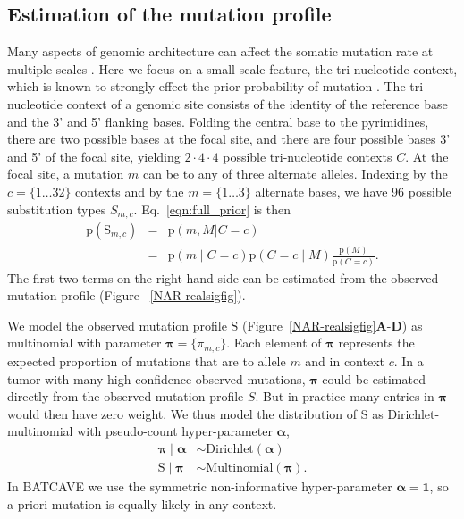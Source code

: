 \documentclass[a4,center,fleqn]{NAR}
\newcommand{\batcave}{BATCAVE }
\begin{document}
\subsection{Estimation of the mutation profile}
Many aspects of genomic architecture can affect the somatic mutation rate at multiple scales \cite{Buisson2019}.
Here we focus on a small-scale feature, the tri-nucleotide context, which is known to strongly effect the prior probability of mutation \citep{Nik-Zainal2012a,Alexandrov2015,Lee-Six2018}.
The tri-nucleotide context of a genomic site consists of the identity of the reference base and the 3' and 5' flanking bases.
Folding the central base to the pyrimidines, there are two possible bases at the focal site, and there are four possible bases 3' and 5' of the focal site, yielding $2 \cdot 4 \cdot 4$ possible tri-nucleotide contexts $C$.
At the focal site, a mutation $m$ can be to any of three alternate alleles.
Indexing by the $c=\{1 \dots 32\}$ contexts and by the $m = \{1 \dots 3\}$ alternate bases, we have 96 possible substitution types $S_{m,c}$.
Eq.~\ref{eqn:full_prior} is then
\begin{equation}
  \label{eqn:detailed_prior}
  \begin{array}{rcl}
  \mathrm{p}(\mathrm{S}_{m,c}) &=&  \mathrm{p}(m, M | C = c) \\
                            &=& \mathrm{p}(m \mid C = c) \mathrm{p}(C = c \mid M)\frac{\mathrm{p}(M)}{\mathrm{p}(C = c)}.
  \end{array}
\end{equation}
The first two terms on the right-hand side can be estimated from the observed mutation profile (Figure ~\ref{NAR-realsigfig}).

We model the observed mutation profile $\mathrm{S}$ (Figure~\ref{NAR-realsigfig}\textbf{A}-\textbf{D}) as multinomial with parameter $\boldsymbol{\pi} = \{\pi_{m,c}\}$.
Each element of $\boldsymbol{\pi}$ represents the expected proportion of mutations that are to allele $m$ and in context $c$.
In a tumor with many high-confidence observed mutations, $\boldsymbol{\pi}$ could be estimated directly from the observed mutation profile $S$.
But in practice many entries in $\boldsymbol{\pi}$ would then have zero weight.
We thus model the distribution of $\mathrm{S}$ as Dirichlet-multinomial with pseudo-count hyper-parameter $\boldsymbol{\alpha}$, 
\begin{equation}
\begin{aligned}
  \boldsymbol{\pi} \mid \boldsymbol{\alpha} &\sim \textrm{Dirichlet}(\boldsymbol{\alpha}) \\
  \mathrm{S} \mid \boldsymbol{\pi} & \sim \textrm{Multinomial}(\boldsymbol{\pi}).
\end{aligned}
\end{equation}
In \batcave we use the symmetric non-informative hyper-parameter $\boldsymbol{\alpha} = \boldsymbol{1}$, so a priori mutation is equally likely in any context.
\end{document}
